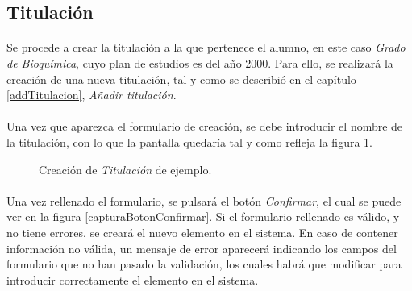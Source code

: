 \subsection{Titulación}

  \paragraph{}Se procede a crear la titulación a la que pertenece el alumno, en
  este caso \textit{Grado de Bioquímica}, cuyo plan de estudios es del año 2000.
  Para ello, se realizará la creación de una nueva titulación, tal y como se
  describió en el capítulo \ref{addTitulacion}, \textit{Añadir titulación}.

  \paragraph{}Una vez que aparezca el formulario de creación, se debe introducir
  el nombre de la titulación, con lo que la pantalla quedaría tal y como refleja
  la figura \ref{ejemploAddTitulacion}.

  \begin{figure}[!ht]
    \begin{center}
      \caption{Creación de \textit{Titulación} de ejemplo.}
      \label{ejemploAddTitulacion}
    \end{center}
  \end{figure}

  \paragraph{}Una vez rellenado el formulario, se pulsará el botón
  \textit{Confirmar}, el cual se puede ver en la figura
  \ref{capturaBotonConfirmar}. Si el formulario rellenado es válido, y no tiene
  errores, se creará el nuevo elemento en el sistema. En caso de contener
  información no válida, un mensaje de error aparecerá indicando los campos
  del formulario que no han pasado la validación, los cuales habrá que modificar
  para introducir correctamente el elemento en el sistema.

